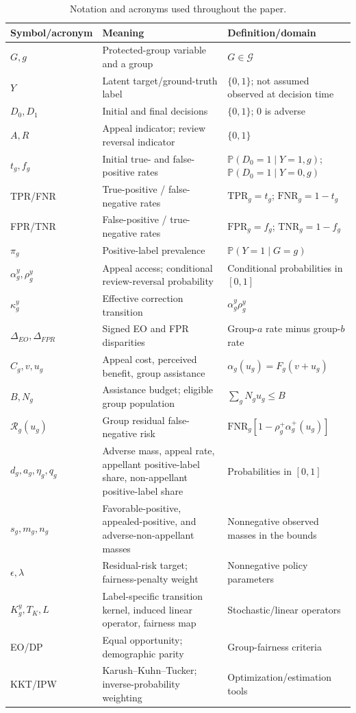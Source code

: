 \documentclass[manuscript,screen,review]{jair}
\newcommand{\Prb}{\mathbb{P}}
\begin{document}
\begin{table}[t]
\centering
\caption{Notation and acronyms used throughout the paper.}
\label{tab:notation}
\footnotesize
\begin{tabularx}{\linewidth}{@{}>{\raggedright\arraybackslash}p{.19\linewidth}Y
  >{\raggedright\arraybackslash}p{.30\linewidth}@{}}
\toprule
Symbol/acronym & Meaning & Definition/domain \\
\midrule
$G,g$ & Protected-group variable and a group & $G\in\mathcal G$ \\
$Y$ & Latent target/ground-truth label & $\{0,1\}$; not assumed observed at decision time \\
$D_0,D_1$ & Initial and final decisions & $\{0,1\}$; 0 is adverse \\
$A,R$ & Appeal indicator; review reversal indicator & $\{0,1\}$ \\
$t_g,f_g$ & Initial true- and false-positive rates & $\Prb(D_0=1\mid Y=1,g)$; $\Prb(D_0=1\mid Y=0,g)$ \\
TPR/FNR & True-positive / false-negative rates & $\mathrm{TPR}_g=t_g$; $\mathrm{FNR}_g=1-t_g$ \\
FPR/TNR & False-positive / true-negative rates & $\mathrm{FPR}_g=f_g$; $\mathrm{TNR}_g=1-f_g$ \\
$\pi_g$ & Positive-label prevalence & $\Prb(Y=1\mid G=g)$ \\
$\alpha_g^y,\rho_g^y$ & Appeal access; conditional review-reversal probability & Conditional probabilities in $[0,1]$ \\
$\kappa_g^y$ & Effective correction transition & $\alpha_g^y\rho_g^y$ \\
$\Delta_{EO},\Delta_{FPR}$ & Signed EO and FPR disparities & Group-$a$ rate minus group-$b$ rate \\
$C_g,v,u_g$ & Appeal cost, perceived benefit, group assistance & $\alpha_g(u_g)=F_g(v+u_g)$ \\
$B,N_g$ & Assistance budget; eligible group population & $\sum_g N_gu_g\le B$ \\
$\mathcal R_g(u_g)$ & Group residual false-negative risk & $\mathrm{FNR}_g[1-\rho_g^+\alpha_g^+(u_g)]$ \\
$d_g,a_g,\eta_g,q_g$ & Adverse mass, appeal rate, appellant positive-label share, non-appellant positive-label share & Probabilities in $[0,1]$ \\
$s_g,m_g,n_g$ & Favorable-positive, appealed-positive, and adverse-non-appellant masses & Nonnegative observed masses in the bounds \\
$\epsilon,\lambda$ & Residual-risk target; fairness-penalty weight & Nonnegative policy parameters \\
$K_g^y,T_K,L$ & Label-specific transition kernel, induced linear operator, fairness map & Stochastic/linear operators \\
EO/DP & Equal opportunity; demographic parity & Group-fairness criteria \\
KKT/IPW & Karush--Kuhn--Tucker; inverse-probability weighting & Optimization/estimation tools \\
\bottomrule
\end{tabularx}
\end{table}
\end{document}
